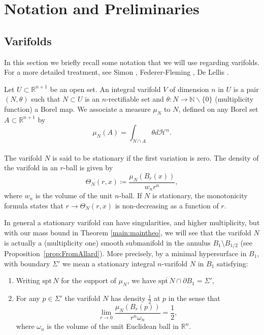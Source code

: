 \documentclass[12pt, reqno ]{amsart}
\numberwithin{equation}{section}
\begin{document}
\section{Notation and Preliminaries}\label{sec:prelim}

\subsection{Varifolds} \label{sec:varifolds}
In this section we briefly recall some notation that we will use regarding varifolds. For a more detailed treatment, see Simon \cite{simon1984lectures}, Federer-Fleming \cite{federer2014geometric}, De Lellis \cite{DeL12}.

Let $U\subset \mathbb R^{n+1}$ be an open set. An integral varifold $V$ of dimension $n$ in $U$ is a pair $(N, \theta)$ such that  $N\subset U$ is an $n$-rectifiable set and $\theta:N\rightarrow \mathbb N\backslash \{0\} $ (multiplicity function) a Borel map. We associate a measure $\mu_N$ to $N$, defined on any Borel set $A\subset\mathbb R^{n+1}$ by
$$ \mu_N(A)=\int_{N\cap A} \theta d\mathcal H^n.$$\\
The varifold $N$ is said to be stationary if the first variation is zero. The density of the varifold in an $r$-ball is given by 
$$ \Theta_N(r, x)\coloneqq \frac{\mu_N( B_r(x))}{w_n r^n},$$
where $w_n$ is the volume of the unit $n$-ball. If $N$ is stationary, the monotonicity formula states that $r\rightarrow\Theta_N(r, x)$ is non-decreasing as a function of $r$. 

In general a stationary varifold can have singularities, and higher multiplicity, but with our mass bound in Theorem \ref{main:maintheo}, we will see that the varifold $N$ is actually a (multiplicity one) smooth submanifold in the annulus $B_1\setminus B_{1/2}$ (see Proposition~\ref{prop:FromAllard}). 
More precisely, by a minimal hypersurface in $B_1$, with boundary $\Sigma'$ we mean a stationary integral $n$-varifold $N$ in $B_1$ satisfying:
\begin{enumerate}
\item Writing $\mathrm{spt}\, N$ for the support of $\mu_N$, we have $\overline{\mathrm{spt}\, N} \cap \partial B_1 = \Sigma'$,
\item For any $p\in \Sigma'$ the varifold $N$ has density $\frac{1}{2}$ at $p$ in the sense that
\[ \lim_{r\to 0} \frac{\mu_N(B_r(p))}{r^n\omega_n} = \frac{1}{2},\]
where $\omega_n$ is the volume of the unit Euclidean ball in $\mathbb{R}^n$. 
\end{enumerate}
\end{document}
